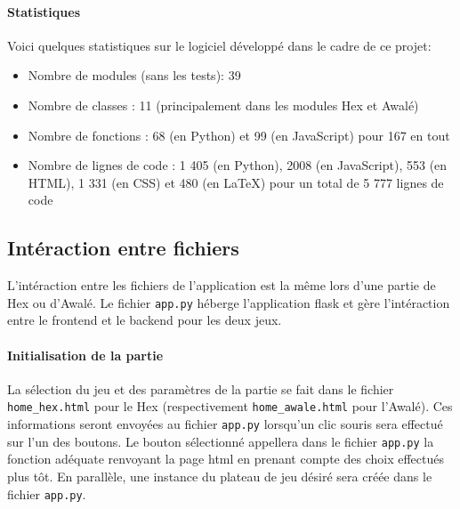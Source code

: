 \paragraph{Statistiques}
Voici quelques statistiques sur le logiciel développé dans le cadre de ce projet:
\begin{itemize}
    \item Nombre de modules (sans les tests): 39
    \item Nombre de classes : 11 (principalement dans les modules Hex et Awalé)
    \item Nombre de fonctions : 68 (en Python) et 99 (en JavaScript) pour 167 en tout
    \item Nombre de lignes de code : 1 405 (en Python), 2008 (en JavaScript), 553 (en HTML), 1 331 (en CSS)
    et 480 (en \LaTeX) pour un total de 5 777 lignes de code
\end{itemize}

\subsection{Intéraction entre fichiers}
L'intéraction entre les fichiers de l'application est la même lors d'une partie de Hex ou 
d'Awalé. Le fichier \texttt{app.py} héberge l'application flask et gère l'intéraction entre le frontend et le 
backend pour les deux jeux.

\paragraph{Initialisation de la partie}
La sélection du jeu et des paramètres de la partie se fait dans le fichier \texttt{home\_hex.html} pour le Hex
(respectivement \texttt{home\_awale.html} pour l'Awalé). Ces informations seront envoyées au fichier \texttt{app.py}
lorsqu'un clic souris sera effectué sur l'un des boutons. Le bouton sélectionné appellera dans le fichier \texttt{app.py} la 
fonction adéquate renvoyant la page html en prenant compte des choix effectués plus tôt. En parallèle, une instance du plateau de
jeu désiré sera créée dans le fichier \texttt{app.py}. 

